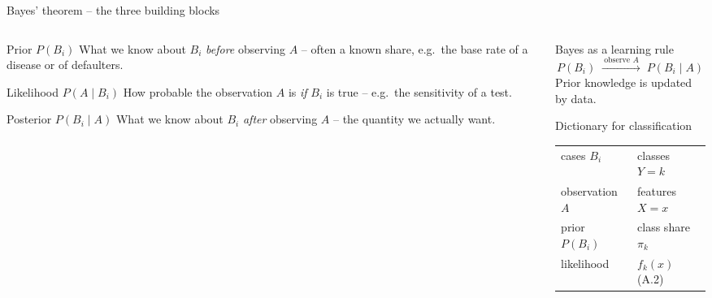 \documentclass[aspectratio=169,11pt]{beamer}
\begin{document}
\begin{frame}{Bayes' theorem -- the three building blocks}
  \begin{columns}[T]
    \begin{column}{0.48\textwidth}
      \begin{block}{Prior $P(B_i)$}
        What we know about $B_i$ \emph{before} observing $A$ -- often a known
        share, e.g.\ the base rate of a disease or of defaulters.
      \end{block}
      \begin{block}{Likelihood $P(A\mid B_i)$}
        How probable the observation $A$ is \emph{if} $B_i$ is true -- e.g.\
        the sensitivity of a test.
      \end{block}
      \begin{block}{Posterior $P(B_i\mid A)$}
        What we know about $B_i$ \emph{after} observing $A$ -- the quantity
        we actually want.
      \end{block}
    \end{column}
    \begin{column}{0.48\textwidth}
      \begin{alertblock}{Bayes as a learning rule}
        \[
          P(B_i)\;\xrightarrow{\ \text{observe }A\ }\;P(B_i\mid A)
        \]
        Prior knowledge is updated by data.
      \end{alertblock}
      \begin{exampleblock}{Dictionary for classification}
        \renewcommand{\arraystretch}{1.15}
        \begin{tabular}{@{}ll@{}}
          cases $B_i$ & classes $Y=k$\\
          observation $A$ & features $X=x$\\
          prior $P(B_i)$ & class share $\pi_k$\\
          likelihood & $f_k(x)$ (A.2)\\
        \end{tabular}
      \end{exampleblock}
    \end{column}
  \end{columns}
\end{frame}
\end{document}

